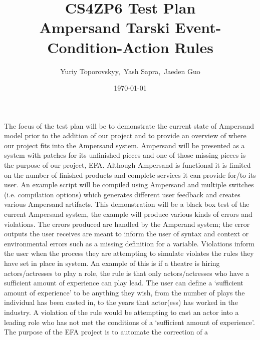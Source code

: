 \documentclass[12pt]{article}
\begin{document}
\title{CS4ZP6 Test Plan \\ Ampersand Tarski Event-Condition-Action 
Rules \\ \vspace{-1ex}} 
\author{\normalsize{Yuriy Toporovskyy,\ Yash Sapra,\ Jaeden Guo}}
\date{\normalsize\today \vspace{-3ex}}
\thispagestyle{empty}
\maketitle
\paragraph{}
The focus of the test plan will be to demonstrate the current state of 
Ampersand model prior to the addition of our project and to provide an overview 
of where our project fits into the Ampersand system. Ampersand will be 
presented as a system with patches for its unfinished pieces and one of those 
missing pieces is the purpose of our project, EFA. Although Ampersand is 
functional it is limited on the number of finished products and complete 
services it can provide for/to its user. An example script will be compiled 
using Ampersand and multiple switches (i.e. compilation options) which 
generates different user feedback and creates various Ampersand artifacts. 
\newline
\indent This demonstration will be a black box test of the current Ampersand 
system, 
the example will produce various kinds of errors and violations. The errors 
produced are handled by the Amperand system; the error outputs the user 
receives are meant to inform the user of syntax and context or environmental 
errors such as a missing definition for a variable. Violations inform the user 
when the process they are attempting to simulate violates the rules they have 
set in place in system. An example of this is if a theatre is hiring 
actors/actresses to play a role, the rule is that only actors/actresses who 
have a sufficient amount of experience can play lead. The user  can define a 
‘sufficient amount of experience’ to be anything they wish, from the number of 
plays the individual has been casted in, to the years that actor(ess) has 
worked in the industry. A violation of the rule would be attempting to cast an 
actor into a leading role who has not met the conditions of a ‘sufficient 
amount of experience’. 
\newline
\indent The purpose of the EFA project is to automate the correction of a 
\end{document}
